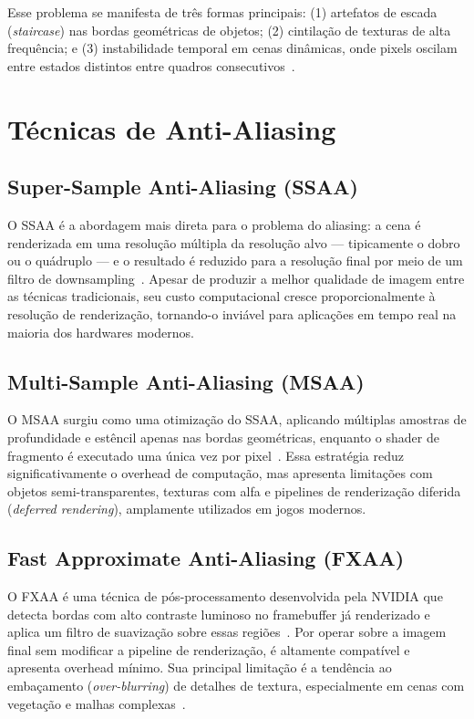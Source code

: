 \documentclass[twoside,english,brazilian]{UNISINOSmonografia}
\begin{document}
Esse problema se manifesta de três formas principais: (1) artefatos de escada (\textit{staircase}) nas bordas geométricas de objetos; (2) cintilação de texturas de alta frequência; e (3) instabilidade temporal em cenas dinâmicas, onde pixels oscilam entre estados distintos entre quadros consecutivos~\cite{feng2025antialiasing}.

\section{Técnicas de Anti-Aliasing}

\subsection{Super-Sample Anti-Aliasing (SSAA)}

O SSAA é a abordagem mais direta para o problema do aliasing: a cena é renderizada em uma resolução múltipla da resolução alvo — tipicamente o dobro ou o quádruplo — e o resultado é reduzido para a resolução final por meio de um filtro de downsampling~\cite{real_time_rendering_4th}. Apesar de produzir a melhor qualidade de imagem entre as técnicas tradicionais, seu custo computacional cresce proporcionalmente à resolução de renderização, tornando-o inviável para aplicações em tempo real na maioria dos hardwares modernos.

\subsection{Multi-Sample Anti-Aliasing (MSAA)}

O MSAA surgiu como uma otimização do SSAA, aplicando múltiplas amostras de profundidade e estêncil apenas nas bordas geométricas, enquanto o shader de fragmento é executado uma única vez por pixel~\cite{real_time_rendering_4th}. Essa estratégia reduz significativamente o overhead de computação, mas apresenta limitações com objetos semi-transparentes, texturas com alfa e pipelines de renderização diferida (\textit{deferred rendering}), amplamente utilizados em jogos modernos.

\subsection{Fast Approximate Anti-Aliasing (FXAA)}

O FXAA é uma técnica de pós-processamento desenvolvida pela NVIDIA que detecta bordas com alto contraste luminoso no framebuffer já renderizado e aplica um filtro de suavização sobre essas regiões~\cite{lottes2011fxaa}. Por operar sobre a imagem final sem modificar a pipeline de renderização, é altamente compatível e apresenta overhead mínimo. Sua principal limitação é a tendência ao embaçamento (\textit{over-blurring}) de detalhes de textura, especialmente em cenas com vegetação e malhas complexas~\cite{feng2025antialiasing}.
\end{document}
